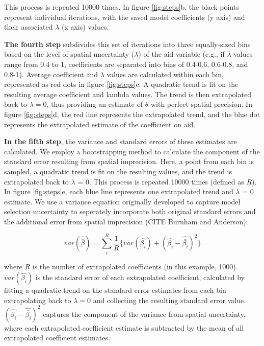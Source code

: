 \documentclass[11pt]{article}
\begin{document}
This process is repeated 10000 times. 
In figure \ref{fig:steps}b, the black points represent individual iterations, with the saved model coefficients (y axis) and their associated $\lambda$ (x axis) values. 
\par
\textbf{The fourth step} subdivides this set of iterations into three equally-sized bins based on the level of spatial uncertainty ($\lambda$) of the aid variable (e.g., if $\lambda$ values range from 0.4 to 1, coefficients are separated into bins of 0.4-0.6, 0.6-0.8, and 0.8-1). 
Average coefficient and $\lambda$ values are calculated within each bin, represented as red dots in figure \ref{fig:steps}c. 
A quadratic trend is fit on the resulting average coefficient and lambda values. 
The trend is then extrapolated back to $\lambda=0$, thus providing an estimate of $\theta$ with perfect spatial precision. 
In figure \ref{fig:steps}d, the red line represents the extrapolated trend, and the blue dot represents the extrapolated estimate of the coefficient on aid. 
\par 

\textbf{In the fifth step}, the variance and standard errors of these estimates are calculated. 
We employ a bootstrapping method to calculate the component of the standard error resulting from spatial imprecision. Here, a point from each bin is sampled, a quadratic trend is fit on the resulting values, and the trend is extrapolated back to $\lambda$ = 0. 
This process is repeated 10000 times (defined as $R$). 
In figure \ref{fig:steps}e, each blue line represents one extrapolated trend and $\lambda$ = 0 estimate. 
We use a variance equation originally developed to capture model selection uncertainty to seperately incorporate both original standard errors and the additional error from spatial imprecision (CITE Burnham and Anderson):

\begin{equation}\label{variance}
var(\hat{\bar{\beta}}) = \sum_i^R \frac{1}{R} \{ var(\hat{\beta_i}) + (\hat{\beta_i}-\hat{\bar{\beta_i}})^2 \}
\end{equation}

\noindent where $R$ is the number of extrapolated coefficients (in this example, 1000). 
$var(\hat{\beta_i})$ is the standard error of each extrapolated coefficient, calculated by fitting a quadratic trend on the standard error estimates from each bin extrapolating back to $\lambda=0$ and collecting the resulting standard error value. 
$(\hat{\beta_i}-\hat{\bar{\beta_i}})^2$ captures the component of the variance from spatial uncertainty, where each extrapolated coefficient estimate is subtracted by the mean of all extrapolated coefficient estimates.  
\end{document}
